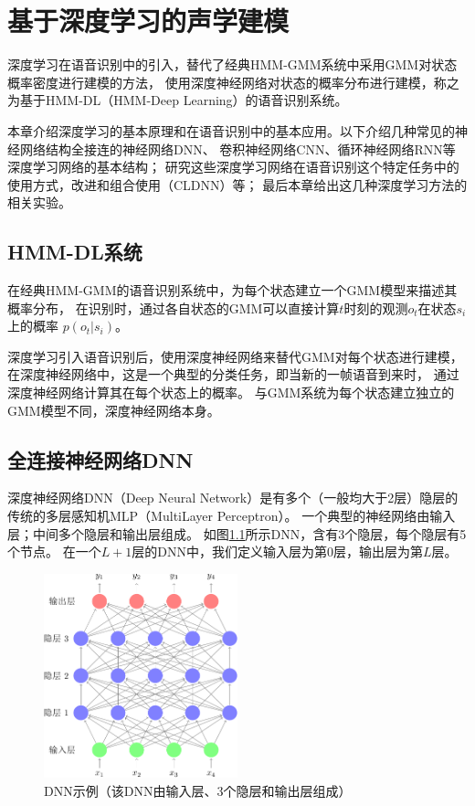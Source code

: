 ﻿%

\chapter{基于深度学习的声学建模}\label{intro_dl}


深度学习在语音识别中的引入，替代了经典HMM-GMM系统中采用GMM对状态概率密度进行建模的方法，
使用深度神经网络对状态的概率分布进行建模，称之为基于HMM-DL（HMM-Deep Learning）的语音识别系统。

本章介绍深度学习的基本原理和在语音识别中的基本应用。以下介绍几种常见的神经网络结构全接连的神经网络DNN、
卷积神经网络CNN、循环神经网络RNN等深度学习网络的基本结构；
研究这些深度学习网络在语音识别这个特定任务中的使用方式，改进和组合使用（CLDNN）等；
最后本章给出这几种深度学习方法的相关实验。

\section{HMM-DL系统}

在经典HMM-GMM的语音识别系统中，为每个状态建立一个GMM模型来描述其概率分布，
在识别时，通过各自状态的GMM可以直接计算$t$时刻的观测$o_t$在状态$s_i$上的概率
$p(o_t|s_i)$。

深度学习引入语音识别后，使用深度神经网络来替代GMM对每个状态进行建模，
在深度神经网络中，这是一个典型的分类任务，即当新的一帧语音到来时，
通过深度神经网络计算其在每个状态上的概率。
与GMM系统为每个状态建立独立的GMM模型不同，深度神经网络本身。

\section{全连接神经网络DNN}

深度神经网络DNN（Deep Neural Network）是有多个（一般均大于2层）隐层的传统的多层感知机MLP（MultiLayer Perceptron）。
一个典型的神经网络由输入层；中间多个隐层和输出层组成。
如图\ref{fig:dnn}所示DNN，含有3个隐层，每个隐层有5个节点。
在一个$L+1$层的DNN中，我们定义输入层为第$0$层，输出层为第$L$层。

\begin{figure}
\centering
\includegraphics[width=0.5\textwidth]{figures/chapter3/dnn-crop}
\caption{DNN示例（该DNN由输入层、3个隐层和输出层组成）}
\label{fig:dnn}
\end{figure}

